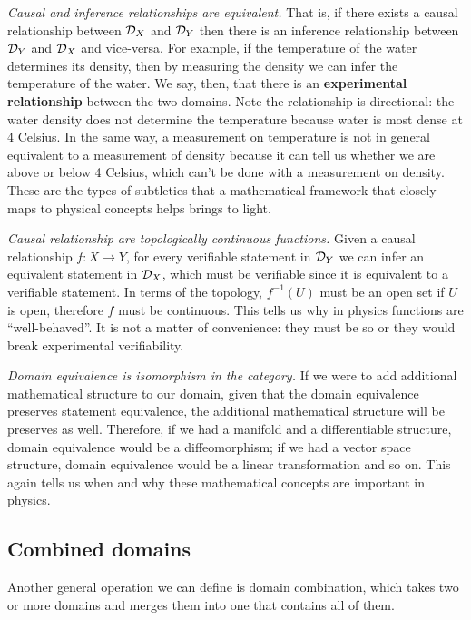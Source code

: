 \documentclass[twocolumn]{article}
\begin{document}
\textit{Causal and inference relationships are equivalent.} That is, if there exists a causal relationship between $\mathcal{D}_X$ and $\mathcal{D}_Y$ then there is an inference relationship between $\mathcal{D}_Y$ and $\mathcal{D}_X$ and vice-versa. For example, if the temperature of the water determines its density, then by measuring the density we can infer the temperature of the water. We say, then, that there is an \textbf{experimental relationship} between the two domains. Note the relationship is directional: the water density does not determine the temperature because water is most dense at 4 Celsius. In the same way, a measurement on temperature is not in general equivalent to a measurement of density because it can tell us whether we are above or below 4 Celsius, which can't be done with a measurement on density. These are the types of subtleties that a mathematical framework that closely maps to physical concepts helps brings to light.

\textit{Causal relationship are topologically continuous functions.} Given a causal relationship $f : X \to Y$, for every verifiable statement in $\mathcal{D}_Y$ we can infer an equivalent statement in $\mathcal{D}_X$, which must be verifiable since it is equivalent to a verifiable statement. In terms of the topology, $f^{-1}(U)$ must be an open set if $U$ is open, therefore $f$ must be continuous. This tells us why in physics functions are ``well-behaved''. It is not a matter of convenience: they must be so or they would break experimental verifiability.

\textit{Domain equivalence is isomorphism in the category.} If we were to add additional mathematical structure to our domain, given that the domain equivalence preserves statement equivalence, the additional mathematical structure will be preserves as well. Therefore, if we had a manifold and a differentiable structure, domain equivalence would be a diffeomorphism; if we had a vector space structure, domain equivalence would be a linear transformation and so on. This again tells us when and why these mathematical concepts are important in physics.

\subsection{Combined domains}

Another general operation we can define is domain combination, which takes two or more domains and merges them into one that contains all of them.
\end{document}

